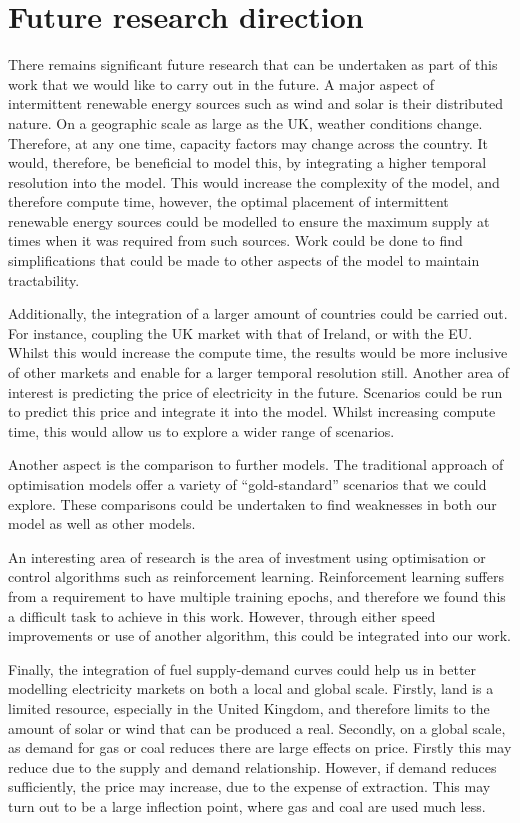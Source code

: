 \section{Future research direction}

There remains significant future research that can be undertaken as part of this work that we would like to carry out in the future. A major aspect of intermittent renewable energy sources such as wind and solar is their distributed nature. On a geographic scale as large as the UK, weather conditions change. Therefore, at any one time, capacity factors may change across the country. It would, therefore, be beneficial to model this, by integrating a higher temporal resolution into the model. This would increase the complexity of the model, and therefore compute time, however, the optimal placement of intermittent renewable energy sources could be modelled to ensure the maximum supply at times when it was required from such sources. Work could be done to find simplifications that could be made to other aspects of the model to maintain tractability. 

Additionally, the integration of a larger amount of countries could be carried out. For instance, coupling the UK market with that of Ireland, or with the EU. Whilst this would increase the compute time, the results would be more inclusive of other markets and enable for a larger temporal resolution still. Another area of interest is predicting the price of electricity in the future. Scenarios could be run to predict this price and integrate it into the model. Whilst increasing compute time, this would allow us to explore a wider range of scenarios. 

Another aspect is the comparison to further models. The traditional approach of optimisation models offer a variety of ``gold-standard'' scenarios that we could explore. These comparisons could be undertaken to find weaknesses in both our model as well as other models. 

An interesting area of research is the area of investment using optimisation or control algorithms such as reinforcement learning. Reinforcement learning suffers from a requirement to have multiple training epochs, and therefore we found this a difficult task to achieve in this work. However, through either speed improvements or use of another algorithm, this could be integrated into our work. 

Finally, the integration of fuel supply-demand curves could help us in better modelling electricity markets on both a local and global scale. Firstly, land is a limited resource, especially in the United Kingdom, and therefore limits to the amount of solar or wind that can be produced a real. Secondly, on a global scale, as demand for gas or coal reduces there are large effects on price. Firstly this may reduce due to the supply and demand relationship. However, if demand reduces sufficiently, the price may increase, due to the expense of extraction. This may turn out to be a large inflection point, where gas and coal are used much less. 


